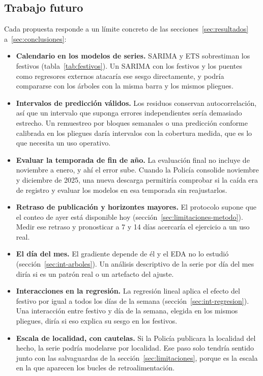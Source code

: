 \subsection{Trabajo futuro}\label{sec:trabajo-futuro}

Cada propuesta responde a un límite concreto de las secciones~\ref{sec:resultados} a~\ref{sec:conclusiones}:
\begin{itemize}
  \item \textbf{Calendario en los modelos de series.} SARIMA y ETS sobrestiman los festivos (tabla~\ref{tab:festivos}). Un SARIMA con los festivos y los puentes como regresores externos atacaría ese sesgo directamente, y podría compararse con los árboles con la misma barra y los mismos pliegues.
  \item \textbf{Intervalos de predicción válidos.} Los residuos conservan autocorrelación, así que un intervalo que suponga errores independientes sería demasiado estrecho. Un remuestreo por bloques semanales o una predicción conforme calibrada en los pliegues daría intervalos con la cobertura medida, que es lo que necesita un uso operativo.
  \item \textbf{Evaluar la temporada de fin de año.} La evaluación final no incluye de noviembre a enero, y ahí el error sube. Cuando la Policía consolide noviembre y diciembre de 2025, una nueva descarga permitiría comprobar si la caída era de registro y evaluar los modelos en esa temporada sin reajustarlos.
  \item \textbf{Retraso de publicación y horizontes mayores.} El protocolo supone que el conteo de ayer está disponible hoy (sección~\ref{sec:limitaciones-metodo}). Medir ese retraso y pronosticar a 7 y 14 días acercaría el ejercicio a un uso real.
  \item \textbf{El día del mes.} El gradiente depende de él y el EDA no lo estudió (sección~\ref{sec:int-arboles}). Un análisis descriptivo de la serie por día del mes diría si es un patrón real o un artefacto del ajuste.
  \item \textbf{Interacciones en la regresión.} La regresión lineal aplica el efecto del festivo por igual a todos los días de la semana (sección~\ref{sec:int-regresion}). Una interacción entre festivo y día de la semana, elegida en los mismos pliegues, diría si eso explica su sesgo en los festivos.
  \item \textbf{Escala de localidad, con cautelas.} Si la Policía publicara la localidad del hecho, la serie podría modelarse por localidad. Ese paso solo tendría sentido junto con las salvaguardas de la sección~\ref{sec:limitaciones}, porque es la escala en la que aparecen los bucles de retroalimentación.
\end{itemize}
